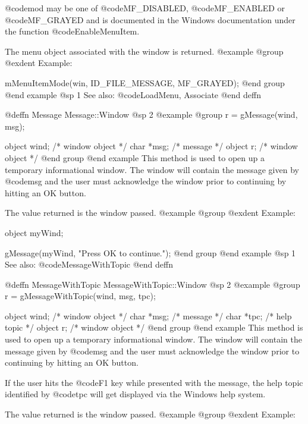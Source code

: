 @code{mod} may be one of @code{MF_DISABLED}, @code{MF_ENABLED} or
@code{MF_GRAYED} and is documented in the Windows documentation under
the function @code{EnableMenuItem}.

The menu object associated with the window is returned.
@example
@group
@exdent Example:

mMenuItemMode(win, ID_FILE_MESSAGE, MF_GRAYED);
@end group
@end example
@sp 1
See also:  @code{LoadMenu, Associate}
@end deffn











@deffn {Message} Message::Window
@sp 2
@example
@group
r = gMessage(wind, msg);

object  wind;   /*  window object  */
char    *msg;   /*  message        */
object  r;      /*  window object  */
@end group
@end example
This method is used to open up a temporary informational window.  The
window will contain the message given by @code{msg} and the user must
acknowledge the window prior to continuing by hitting an OK button.


The value returned is the window passed.
@example
@group
@exdent Example:

object  myWind;

gMessage(myWind, "Press OK to continue.");
@end group
@end example
@sp 1
See also:  @code{MessageWithTopic}
@end deffn












@deffn {MessageWithTopic} MessageWithTopic::Window
@sp 2
@example
@group
r = gMessageWithTopic(wind, msg, tpc);

object  wind;   /*  window object  */
char    *msg;   /*  message        */
char    *tpc;   /*  help topic     */
object  r;      /*  window object  */
@end group
@end example
This method is used to open up a temporary informational window.  The
window will contain the message given by @code{msg} and the user must
acknowledge the window prior to continuing by hitting an OK button.

If the user hits the @code{F1} key while presented with the message,
the help topic identified by @code{tpc} will get displayed via the Windows
help system.

The value returned is the window passed.
@example
@group
@exdent Example:

